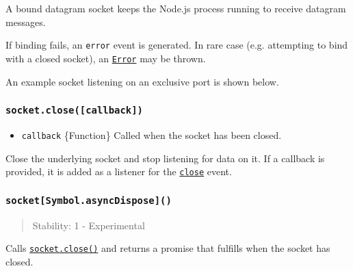 A bound datagram socket keeps the Node.js process running to receive
datagram messages.

If binding fails, an \texttt{\textquotesingle{}error\textquotesingle{}}
event is generated. In rare case (e.g. attempting to bind with a closed
socket), an \href{errors.md\#class-error}{\texttt{Error}} may be thrown.

An example socket listening on an exclusive port is shown below.

\begin{Shaded}
\begin{Highlighting}[]
\NormalTok{(\{}
  \OperatorTok{:} \OperatorTok{,}
  \OperatorTok{:} \OperatorTok{,}
  \OperatorTok{:} \OperatorTok{,}
\NormalTok{\})}\OperatorTok{;}
\end{Highlighting}
\end{Shaded}

\subsubsection{\texorpdfstring{\texttt{socket.close({[}callback{]})}}{socket.close({[}callback{]})}}\label{socket.closecallback}

\begin{itemize}
\tightlist
\item
  \texttt{callback} \{Function\} Called when the socket has been closed.
\end{itemize}

Close the underlying socket and stop listening for data on it. If a
callback is provided, it is added as a listener for the
\hyperref[event-close]{\texttt{\textquotesingle{}close\textquotesingle{}}}
event.

\subsubsection{\texorpdfstring{\texttt{socket{[}Symbol.asyncDispose{]}()}}{socket{[}Symbol.asyncDispose{]}()}}\label{socketsymbol.asyncdispose}

\begin{quote}
Stability: 1 - Experimental
\end{quote}

Calls \hyperref[socketclosecallback]{\texttt{socket.close()}} and
returns a promise that fulfills when the socket has closed.

